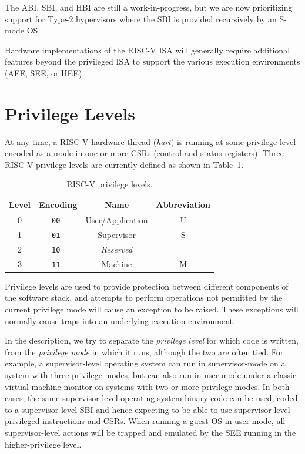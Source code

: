 \begin{commentary}
The ABI, SBI, and HBI are still a work-in-progress, but we are now
prioritizing support for Type-2 hypervisors where the SBI is provided
recursively by an S-mode OS.
\end{commentary}

Hardware implementations of the RISC-V ISA will generally require
additional features beyond the privileged ISA to support the various
execution environments (AEE, SEE, or HEE).

\section{Privilege Levels}

At any time, a RISC-V hardware thread ({\em hart}) is running at some
privilege level encoded as a mode in one or more CSRs (control and
status registers).  Three RISC-V privilege levels are currently defined
as shown in Table~\ref{privlevels}.

\begin{table}[h!]
\begin{center}
\begin{tabular}{|c|c|c|c|}
  \hline
   Level & Encoding & Name      & Abbreviation \\ \hline  
   0     & \tt 00   & User/Application & U     \\ 
   1     & \tt 01   & Supervisor & S           \\ 
   2     & \tt 10   & {\em Reserved} &            \\ 
   3     & \tt 11   & Machine    & M           \\ 
  \hline
 \end{tabular}
\end{center}
\caption{RISC-V privilege levels.}
\label{privlevels}
\end{table}

Privilege levels are used to provide protection between different
components of the software stack, and attempts to perform operations
not permitted by the current privilege mode will cause an exception to
be raised.  These exceptions will normally cause traps into an
underlying execution environment.

\begin{commentary}
In the description, we try to separate the {\em privilege level} for
which code is written, from the {\em privilege mode} in which it runs,
although the two are often tied.  For example, a supervisor-level
operating system can run in supervisor-mode on a system with three
privilege modes, but can also run in user-mode under a classic virtual
machine monitor on systems with two or more privilege modes.  In both
cases, the same supervisor-level operating system binary code can be
used, coded to a supervisor-level SBI and hence expecting to be able
to use supervisor-level privileged instructions and CSRs.  When
running a guest OS in user mode, all supervisor-level actions will be
trapped and emulated by the SEE running in the higher-privilege level.
\end{commentary}

